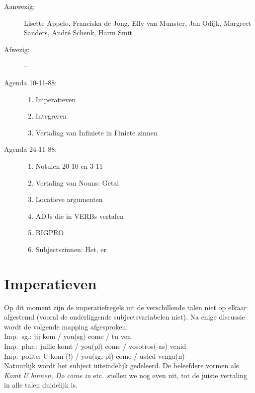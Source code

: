  
      \RosSupersedes{-}
      \MakeRosTitle

\begin{description}
  \item[Aanwezig:] Lisette Appelo, Franciska de Jong, Elly van Munster, 
Jan Odijk, Margreet Sanders, Andr\'{e} Schenk, Harm Smit
  \item[Afwezig:] --
  \item[Agenda 10-11-88:] \mbox{}
    \begin{enumerate}
    \item Imperatieven
    \item Integreren
    \item Vertaling van Infiniete in Finiete zinnen
    \end{enumerate}
  \item[Agenda 24-11-88:]
    \begin{enumerate} \mbox{}
    \setcounter{enumi}{3}
    \item Notulen 20-10 en 3-11
    \item Vertaling van Nouns: Getal
    \item Locatieve argumenten
    \item ADJs die in VERBs vertalen
    \item BIGPRO
    \item Subjectszinnen: Het, er
    \end{enumerate}
\end{description}

\section{Imperatieven}
Op dit moment zijn de imperatiefregels uit de verschillende talen niet op elkaar 
afgestemd (vooral de onderliggende subjectsvariabelen niet). Na enige discussie
wordt de volgende mapping afgesproken:\\
Imp.\ sg.: jij kom / you(sg) come / tu ven\\
Imp.\ plur.: jullie komt / you(pl) come / vosotros(-as) venid\\
Imp.\ polite: U kom (!) / you(sg, pl) come / usted venga(n)\\
Natuurlijk wordt het subject uiteindelijk gedeleerd. De beleefdere vormen als
{\em Komt U binnen, Do come in\/} etc.\ stellen we nog even uit, tot de juiste
vertaling in alle talen duidelijk is.

